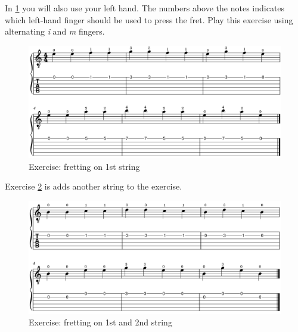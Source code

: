 \newpage

In \ref{fig:exercise_fretting_fingering_first_string} you will also use your left hand. The numbers above the notes indicates which left-hand finger should be used to press the fret. Play this exercise using alternating \textit{i} and \textit{m} fingers. 

\begin{figure}[h]
    \centering
    \includegraphics[width=\textwidth]{../../MuseScore/Guitar/FirstStringFingers.png}
    \caption{Exercise: fretting on 1st string}
    \label{fig:exercise_fretting_fingering_first_string}
\end{figure}

Exercise \ref{fig:exercise_fretting_fingering_first_and_second_string} is adds another string to the exercise.

\begin{figure}[h]
	\centering
	\includegraphics[width=\textwidth]{../../MuseScore/Guitar/FirstAndSecondStringFingers.png}
	\caption{Exercise: fretting on 1st and 2nd string}
	\label{fig:exercise_fretting_fingering_first_and_second_string}
\end{figure}